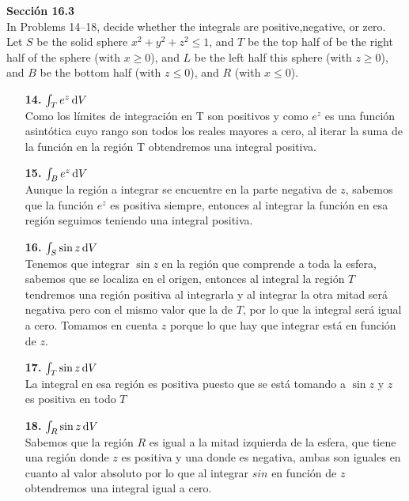\documentclass[11pt]{report}
\begin{document}
\textbf{Sección 16.3} \\

In Problems 14–18, decide whether the integrals are positive,negative, or zero.
Let $S$ be the solid sphere $x^2 + y^2 + z^2 \leq 1$, and $T$ be the top half of
be the right half of the sphere (with $x \geq 0$), and $L$ be the left half
this sphere (with $z \geq 0$), and $B$ be the bottom half (with $z \leq 0$), and $R$
(with $x \leq 0$). \\
\begin{itemize}
	\item[\textbf{14.}]$ \int _T e^z \, \text dV$\\
	Como los límites de integración en T son positivos y como $e^z$ es una función asintótica cuyo rango son todos los reales mayores a cero, al iterar la suma de la función en la región T obtendremos una integral positiva.

	\item[\textbf{15.}]$ \int _B e^z \, \text dV $\\

	Aunque la región a integrar se encuentre en la parte negativa de $z$, sabemos que la función $e^z$ es positiva siempre, entonces al integrar la función en esa región seguimos teniendo una integral positiva.

	\item[\textbf{16.}]$\int _S \sin{z} \, \text dV$\\
	Tenemos que integrar $\sin z $ en la región que comprende a toda la esfera, sabemos que se localiza en el origen, entonces al integral la región $T$ tendremos una región positiva al integrarla y al integrar la otra mitad será negativa pero con el mismo valor que la de $T$, por lo que la integral será igual a cero. Tomamos en cuenta $z$ porque lo que hay que integrar está en función de $z$.

	\item[\textbf{17.}]$ \int _T \sin{z} \, \text dV$\\
	La integral en esa región es positiva puesto que se está tomando a $\sin z$  y $z$ es positiva en todo $T$

	\item[\textbf{18.}]$\int _R \sin{z} \, \text dV $\\
	Sabemos que la región $R$ es igual a la mitad izquierda de la esfera, que tiene una región donde $z$ es positiva y una donde es negativa, ambas son iguales en cuanto al valor absoluto por lo que al integrar $sin$ en función de $z$ obtendremos una integral igual a cero.
\end{itemize}
\end{document}
